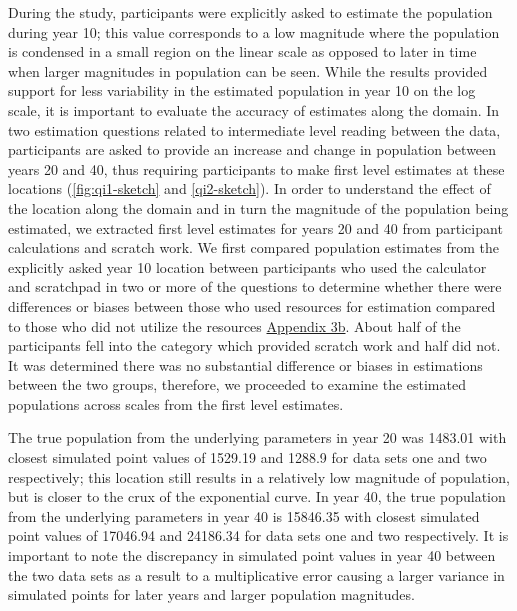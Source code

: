 \documentclass[print]{nuthesis}
\begin{document}
During the study, participants were explicitly asked to estimate the population during year 10; this value corresponds to a low magnitude where the population is condensed in a small region on the linear scale as opposed to later in time when larger magnitudes in population can be seen.
While the results provided support for less variability in the estimated population in year 10 on the log scale, it is important to evaluate the accuracy of estimates along the domain.
In two estimation questions related to intermediate level reading between the data, participants are asked to provide an increase and change in population between years 20 and 40, thus requiring participants to make first level estimates at these locations (\cref{fig:qi1-sketch} and \cref{qi2-sketch}).
In order to understand the effect of the location along the domain and in turn the magnitude of the population being estimated, we extracted first level estimates for years 20 and 40 from participant calculations and scratch work.
We first compared population estimates from the explicitly asked year 10 location between participants who used the calculator and scratchpad in two or more of the questions to determine whether there were differences or biases between those who used resources for estimation compared to those who did not utilize the resources \protect\hyperlink{estimation-comparison}{Appendix 3b}.
About half of the participants fell into the category which provided scratch work and half did not.
It was determined there was no substantial difference or biases in estimations between the two groups, therefore, we proceeded to examine the estimated populations across scales from the first level estimates.

The true population from the underlying parameters in year 20 was 1483.01 with closest simulated point values of 1529.19 and 1288.9 for data sets one and two respectively; this location still results in a relatively low magnitude of population, but is closer to the crux of the exponential curve.
In year 40, the true population from the underlying parameters in year 40 is 15846.35 with closest simulated point values of 17046.94 and 24186.34 for data sets one and two respectively.
It is important to note the discrepancy in simulated point values in year 40 between the two data sets as a result to a multiplicative error causing a larger variance in simulated points for later years and larger population magnitudes.
\end{document}

